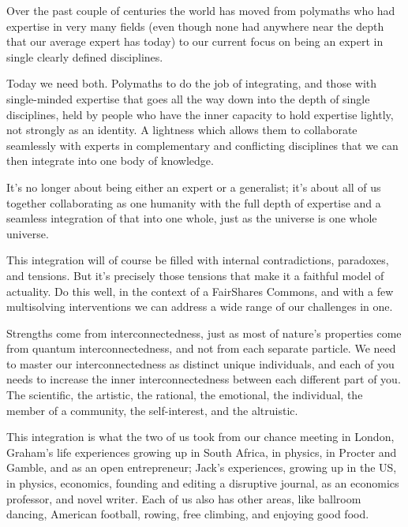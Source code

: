Over the past couple of centuries the world has moved from polymaths who had expertise in very many fields (even though none had anywhere near the depth that our average expert has today) to our current focus on being an expert in single clearly defined disciplines.


Today we need both. Polymaths  to do the job of integrating, and those with single-minded expertise that goes all the way down into the depth of single disciplines, held by people who have the inner capacity to hold expertise lightly, not strongly as an identity. A lightness which allows them to collaborate seamlessly with experts in complementary and conflicting disciplines that we can then integrate into one body of knowledge.


It's no longer about being either an expert or a generalist; it's about all of us together collaborating as one humanity with the full depth of expertise and a seamless integration of that into one whole, just as the universe is one whole universe.


This integration will of course be filled with internal contradictions, paradoxes, and tensions. But it's precisely those tensions that make it a faithful model of actuality. Do this well, in the context of a FairShares Commons,  and with a few multisolving interventions\cite{sawin-multisolving} we can address a wide range of our challenges in one.


Strengths come from interconnectedness, just as most of nature’s properties come from quantum interconnectedness, and not from each separate particle. We need to master our interconnectedness as distinct unique individuals, and each of you needs to increase the inner interconnectedness between each different part of you. The scientific, the artistic, the rational, the emotional, the individual, the member of a community, the self-interest, and the altruistic.


This integration is what the two of us took from our chance meeting in London, Graham’s life experiences growing up in South Africa, in physics, in Procter and Gamble, and as an open entrepreneur; Jack's experiences, growing up in the US, in physics, economics, founding and editing a disruptive journal, as an economics professor, and novel writer. Each of us also has other areas, like ballroom dancing, American football, rowing, free climbing, and enjoying good food.   


